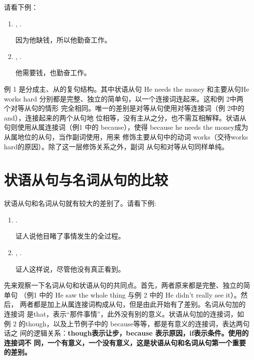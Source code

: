 请看下例：

\begin{enumerate}
\item {} , .

  因为他缺钱，所以他勤奋工作。
\item {},  .

  他需要钱，也勤奋工作。
\end{enumerate}

例 1 是分成主、从的复句结构。其中状语从句 He needs the money 和主要从句He works
hard 分别都是完整、独立的简单句，以一个连接词连起来。这和例 2中两个对等从句的情形
完全相同。唯一的差别是对等从句使用对等连接词（例 2中的and），连接起来的两个从句地
位相等，没有主从之分，也不需互相解释。状语从句则使用从属连接词（例1 中的
because），使得 because he needs the money成为从属地位的从句，当作副词使用，用来
修饰主要从句中的动词 works（交待works hard的原因）。除了这一层修饰关系之外，副词
从句和对等从句同样单纯。

\section{状语从句与名词从句的比较}

状语从句和名词从句就有较大的差别了。请看下例:

\begin{enumerate}
\item {}   .

  证人说他目睹了事情发生的全过程。
\item {}  , 
  .

  证人这样说，尽管他没有真正看到。
\end{enumerate}

先来观察一下名词从句和状语从句的共同点。首先，两者原来都是完整、独立的简单句
（例1 中的 He saw the whole thing 与例 2 中的 He didn't really see it）。然后，
两者都是加上从属连接词构成从句，但是由此开始有了差别。名词从句加的连接词
是that，表示“那件事情”，此外没有别的意义。状语从句加的连接词，如
例 2 的though，以及上节例子中的 because等等，都是有意义的连接词，表达两句话之
间的逻辑关系：\textbf{though表示让步，because 表示原因，if表示条件。使用的连接词不
同，一个有意义，一个没有意义，这是状语从句和名词从句第一个重要的差别。}

